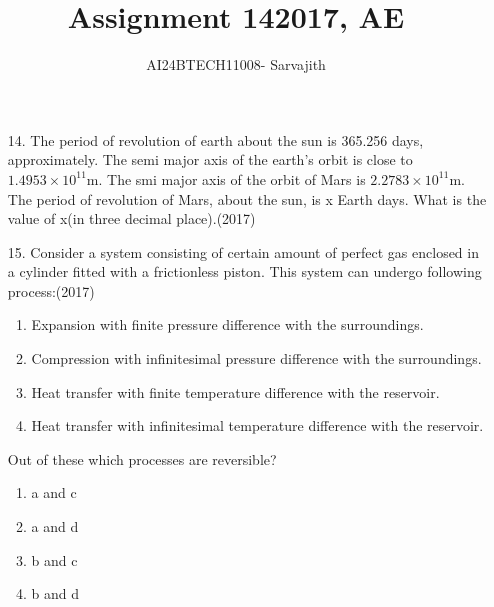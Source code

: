 \documentclass[journal]{IEEEtran}
\begin{document}

\vspace{3cm}


\author{AI24BTECH11008- Sarvajith
}
\title{Assignment 14}
{\let\newpage\relax\maketitle}
\title{2017, AE}
\renewcommand{\thefigure}{\theenumi}
\renewcommand{\thetable}{\theenumi}
\setlength{\intextsep}{10pt} %
\renewcommand{\thetable}{\theenumi}
\begin{enumerate}
    \item[14.] The period of revolution of earth about the sun is 365.256 days, approximately. The semi major axis of the earth's orbit is close to $1.4953\times 10^{11}$m. The smi major axis of the orbit of Mars is $2.2783\times 10^{11}$m. The period of revolution of Mars, about the sun, is x Earth days. What is the value of x(in three decimal place).\hfill (2017)
    \item[15.] Consider a system consisting of certain amount of perfect gas enclosed in a cylinder fitted with a frictionless piston. This system can undergo following process:\hfill (2017)
    \begin{enumerate}
        \item Expansion with finite pressure difference with the surroundings.
        \item Compression with infinitesimal pressure difference with the surroundings.
        \item Heat transfer with finite temperature difference with the reservoir.
        \item Heat transfer with infinitesimal temperature difference with the reservoir.
    \end{enumerate}
    Out of these which processes are reversible?
    \begin{enumerate}[label=(\Alph*)]
        \item a and c
        \item a and d 
        \item b and c 
        \item b and d 
    \end{enumerate}
    

\end{enumerate}
\end{document}
